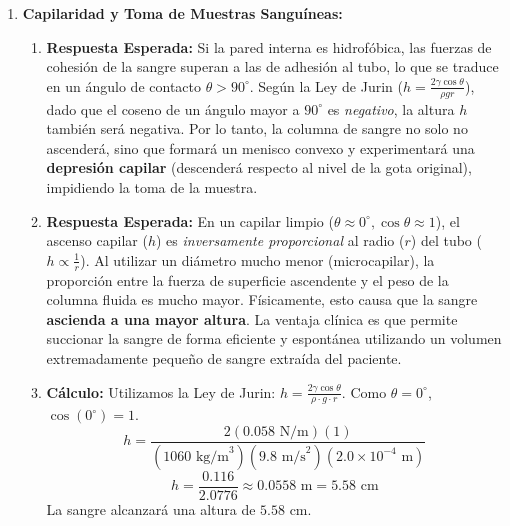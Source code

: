\documentclass[11pt,letterpaper]{article}
\begin{document}
\begin{enumerate}[leftmargin=*]
    \item \textbf{Capilaridad y Toma de Muestras Sanguíneas:}
    \begin{enumerate}
        \item \textbf{Respuesta Esperada:} Si la pared interna es hidrofóbica, las fuerzas de cohesión de la sangre superan a las de adhesión al tubo, lo que se traduce en un ángulo de contacto $\theta > 90^\circ$. Según la Ley de Jurin ($h = \frac{2\gamma \cos \theta}{\rho g r}$), dado que el coseno de un ángulo mayor a $90^\circ$ es \textit{negativo}, la altura $h$ también será negativa. Por lo tanto, la columna de sangre no solo no ascenderá, sino que formará un menisco convexo y experimentará una \textbf{depresión capilar} (descenderá respecto al nivel de la gota original), impidiendo la toma de la muestra.
        \item \textbf{Respuesta Esperada:} En un capilar limpio ($\theta \approx 0^\circ, \cos \theta \approx 1$), el ascenso capilar ($h$) es \textit{inversamente proporcional} al radio ($r$) del tubo ($h \propto \frac{1}{r}$). Al utilizar un diámetro mucho menor (microcapilar), la proporción entre la fuerza de superficie ascendente y el peso de la columna fluida es mucho mayor. Físicamente, esto causa que la sangre \textbf{ascienda a una mayor altura}. La ventaja clínica es que permite succionar la sangre de forma eficiente y espontánea utilizando un volumen extremadamente pequeño de sangre extraída del paciente.
        \item \textbf{Cálculo:} Utilizamos la Ley de Jurin: $h = \frac{2\gamma \cos \theta}{\rho \cdot g \cdot r}$. Como $\theta = 0^\circ$, $\cos(0^\circ) = 1$.
        \[ h = \frac{2(0.058 \text{ N/m})(1)}{(1060 \text{ kg/m}^3)(9.8 \text{ m/s}^2)(2.0 \times 10^{-4} \text{ m})} \]
        \[ h = \frac{0.116}{2.0776} \approx 0.0558 \text{ m} = 5.58 \text{ cm} \]
        La sangre alcanzará una altura de $5.58 \text{ cm}$.
    \end{enumerate}

\end{enumerate}
\end{document}
